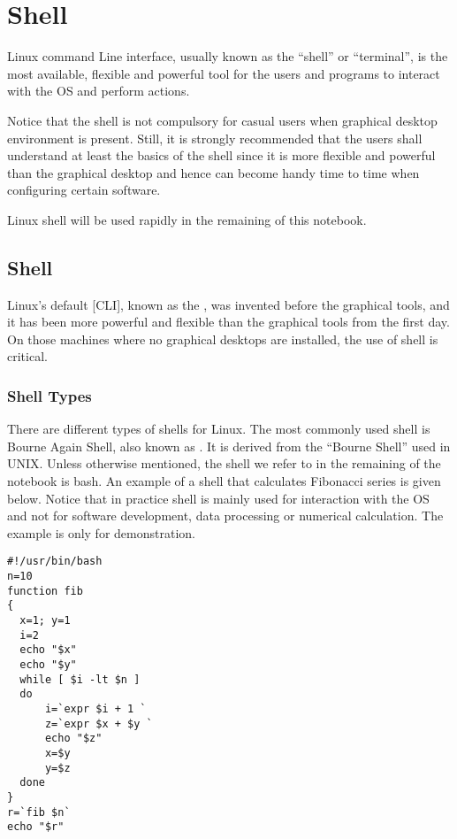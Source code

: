 \chapter{Shell} \label{ch:sb}

Linux command Line interface, usually known as the ``shell'' or ``terminal'', is the most available, flexible and powerful tool for the users and programs to interact with the OS and perform actions.

Notice that the shell is not compulsory for casual users when graphical desktop environment is present. Still, it is strongly recommended that the users shall understand at least the basics of the shell since it is more flexible and powerful than the graphical desktop and hence can become handy time to time when configuring certain software.

Linux shell will be used rapidly in the remaining of this notebook.

\section{Shell}

Linux's default [CLI], known as the , was invented before the graphical tools, and it has been more powerful and flexible than the graphical tools from the first day. On those machines where no graphical desktops are installed, the use of shell is critical.

\subsection{Shell Types}

There are different types of shells for Linux. The most commonly used shell is Bourne Again Shell, also known as . It is derived from the ``Bourne Shell'' used in UNIX. Unless otherwise mentioned, the shell we refer to in the remaining of the notebook is bash. An example of a shell that calculates Fibonacci series is given below. Notice that in practice shell is mainly used for interaction with the OS and not for software development, data processing or numerical calculation. The example is only for demonstration.

\begin{lstlisting}
#!/usr/bin/bash
n=10
function fib
{
  x=1; y=1
  i=2
  echo "$x"
  echo "$y"
  while [ $i -lt $n ]
  do
      i=`expr $i + 1 `
      z=`expr $x + $y `
      echo "$z"
      x=$y
      y=$z
  done
}
r=`fib $n`
echo "$r"
\end{lstlisting}

